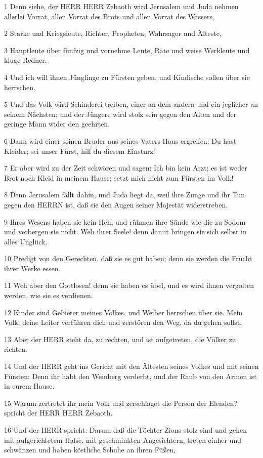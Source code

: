 \par 1 Denn siehe, der HERR HERR Zebaoth wird Jerusalem und Juda nehmen allerlei Vorrat, allen Vorrat des Brots und allen Vorrat des Wassers,
\par 2 Starke und Kriegsleute, Richter, Propheten, Wahrsager und Älteste,
\par 3 Hauptleute über fünfzig und vornehme Leute, Räte und weise Werkleute und kluge Redner.
\par 4 Und ich will ihnen Jünglinge zu Fürsten geben, und Kindische sollen über sie herrschen.
\par 5 Und das Volk wird Schinderei treiben, einer an dem andern und ein jeglicher an seinem Nächsten; und der Jüngere wird stolz sein gegen den Alten und der geringe Mann wider den geehrten.
\par 6 Dann wird einer seinen Bruder aus seines Vaters Haus ergreifen: Du hast Kleider; sei unser Fürst, hilf du diesem Einsturz!
\par 7 Er aber wird zu der Zeit schwören und sagen: Ich bin kein Arzt; es ist weder Brot noch Kleid in meinem Hause; setzt mich nicht zum Fürsten im Volk!
\par 8 Denn Jerusalem fällt dahin, und Juda liegt da, weil ihre Zunge und ihr Tun gegen den HERRN ist, daß sie den Augen seiner Majestät widerstreben.
\par 9 Ihres Wesens haben sie kein Hehl und rühmen ihre Sünde wie die zu Sodom und verbergen sie nicht. Weh ihrer Seele! denn damit bringen sie sich selbst in alles Unglück.
\par 10 Predigt von den Gerechten, daß sie es gut haben; denn sie werden die Frucht ihrer Werke essen.
\par 11 Weh aber den Gottlosen! denn sie haben es übel, und es wird ihnen vergolten werden, wie sie es verdienen.
\par 12 Kinder sind Gebieter meines Volkes, und Weiber herrschen über sie. Mein Volk, deine Leiter verführen dich und zerstören den Weg, da du gehen sollst.
\par 13 Aber der HERR steht da, zu rechten, und ist aufgetreten, die Völker zu richten.
\par 14 Und der HERR geht ins Gericht mit den Ältesten seines Volkes und mit seinen Fürsten: Denn ihr habt den Weinberg verderbt, und der Raub von den Armen ist in eurem Hause.
\par 15 Warum zertretet ihr mein Volk und zerschlaget die Person der Elenden? spricht der HERR HERR Zebaoth.
\par 16 Und der HERR spricht: Darum daß die Töchter Zions stolz sind und gehen mit aufgerichtetem Halse, mit geschminkten Angesichtern, treten einher und schwänzen und haben köstliche Schuhe an ihren Füßen,

